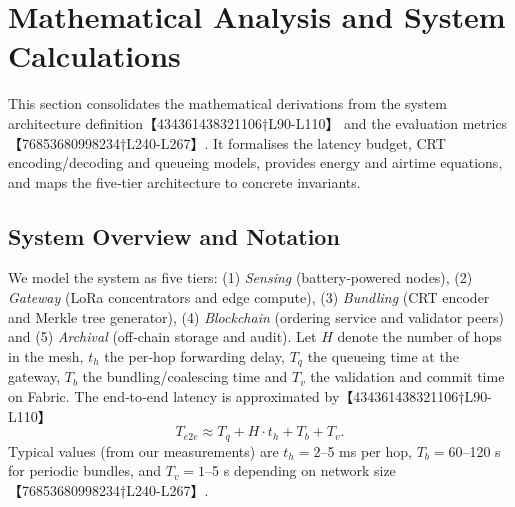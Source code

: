 \section{Mathematical Analysis and System Calculations}
\label{sec:math-analysis}
This section consolidates the mathematical derivations from the system architecture
definition【434361438321106†L90-L110】 and the evaluation metrics【76853680998234†L240-L267】.
It formalises the latency budget, CRT encoding/decoding and queueing models, provides
energy and airtime equations, and maps the five‑tier architecture to concrete invariants.

\subsection{System Overview and Notation}
We model the system as five tiers: (1) \emph{Sensing} (battery‑powered nodes),
(2) \emph{Gateway} (LoRa concentrators and edge compute), (3) \emph{Bundling} (CRT encoder
and Merkle tree generator), (4) \emph{Blockchain} (ordering service and validator peers) and
(5) \emph{Archival} (off‑chain storage and audit).  Let \(H\) denote the number of hops in
the mesh, \(t_h\) the per‑hop forwarding delay, \(T_q\) the queueing time at the gateway,
\(T_b\) the bundling/coalescing time and \(T_v\) the validation and commit time on Fabric.
The end‑to‑end latency is approximated by【434361438321106†L90-L110】
\begin{equation}
T_{e2e} \approx T_q + H \cdot t_h + T_b + T_v.
\end{equation}
Typical values (from our measurements) are \(t_h=2\)–5 ms per hop, \(T_b=60\)–120 s for
periodic bundles, and \(T_v=1\)–5 s depending on network size【76853680998234†L240-L267】.

